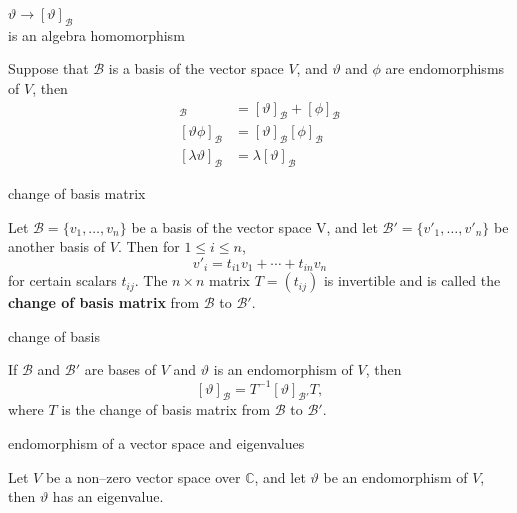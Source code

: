 \documentclass[avery5371,grid]{flashcards}
\newcommand{\C}{\mathbb{C}}
\newcommand{\B}{\mathscr{B}}
\renewcommand{\le}{\leqslant}
\renewcommand{\theta}{\vartheta}
\newcommand{\defn}[1]{\textbf{#1}}
\begin{document}
\begin{flashcard}[Theorem]{$\theta \to [\theta]_{\B}$\\ is an algebra homomorphism}

  Suppose that $\B$ is a basis of the vector space $V$, and $\theta$
  and $\phi$ are endomorphisms of $V$, then
  \begin{align*}
    [\theta + \phi]_{\B} &= [\theta]_{\B} + [\phi]_{\B} \\
    [\theta \phi]_{\B} &= [\theta]_{\B} [\phi]_{\B} \\
    [\lambda \theta]_{\B} &= \lambda[\theta]_{\B}
  \end{align*}

\end{flashcard}

\begin{flashcard}[Definition 2.23]{change of basis matrix}

  Let $\B = \{v_1, \ldots, v_n \}$ be a basis of the vector space V,
  and let $\B' = \{v'_1, \ldots, v'_n \}$ be another basis of $V$.
  Then for $1 \le i \le n$,
  \[
    v'_i = t_{i1} v_1 + \cdots + t_{in} v_n
  \]
  for certain scalars $t_{ij}$. The $n\times n$ matrix $T=(t_{ij})$ is
  invertible and is called the \defn{change of basis matrix} from $\B$
  to $\B'$.

\end{flashcard}

\begin{flashcard}[Theorem 2.24]{change of basis}

  If $\B$ and $\B'$ are bases of $V$ and $\theta$ is an endomorphism
  of $V$, then
  \[
    [\theta]_{\B} = T^{-1}[\theta]_{\B'}T,
  \]
  where $T$ is the change of basis matrix from $\B$ to $\B'$.

\end{flashcard}


\begin{flashcard}[Theorem 2.26]{endomorphism of a vector space and
    eigenvalues}

  Let $V$ be a non--zero vector space over $\C$, and let $\theta$ be
  an endomorphism of $V$, then $\theta$ has an eigenvalue.

\end{flashcard}
\end{document}
